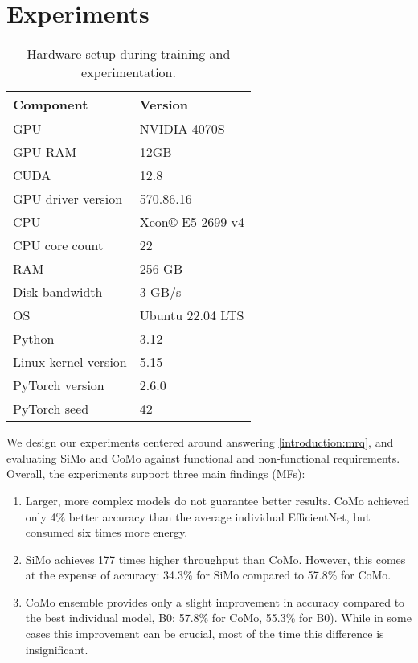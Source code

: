 \section{Experiments} \label{sec:experiments} 

\begin{table}[t]
\centering
\caption{Hardware setup during training and experimentation.}
\label{tab:eval:experiment-setup}
\begin{tabularx}{\linewidth} {XX}
    \toprule
    Component & Version \\
    \midrule
     GPU & NVIDIA 4070S \\
        GPU RAM & 12GB \\
        CUDA & 12.8 \\
        GPU driver version & 570.86.16 \\
        CPU & Xeon® E5-2699 v4 \\
        CPU core count & 22 \\
        RAM & 256 GB \\
        Disk bandwidth & 3 GB/s \\
        OS & Ubuntu 22.04 LTS \\
        Python & 3.12 \\
        Linux kernel version & 5.15 \\
        PyTorch version & 2.6.0 \\
        PyTorch seed & 42 \\
    \bottomrule
\end{tabularx}
\end{table}

We design our experiments centered around answering \ref{introduction:mrq}, and evaluating SiMo and CoMo against functional and non-functional requirements. Overall, the experiments support three main findings (MFs):

\begin{enumerate}[label=\textbf{MF\arabic*}]
\item \label{evaluation:mf1} Larger, more complex models do not guarantee better results. CoMo achieved only 4\% better accuracy than the average individual EfficientNet, but consumed six times more energy.
\item \label{evaluation:mf2} SiMo achieves 177 times higher throughput than CoMo. However, this comes at the expense of accuracy: 34.3\% for SiMo compared to 57.8\% for CoMo.
\item \label{evaluation:mf3} CoMo ensemble provides only a slight improvement in accuracy compared to the best individual model, B0: 57.8\% for CoMo, 55.3\% for B0). While in some cases this improvement can be crucial, most of the time this difference is insignificant.
\end{enumerate}

